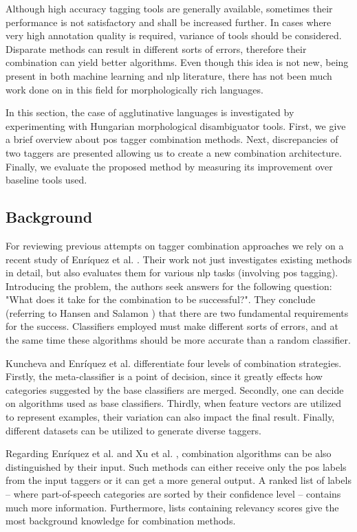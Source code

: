 Although high accuracy tagging tools are generally available, sometimes their performance is not satisfactory and shall be increased further.
In cases where very high annotation quality is required, variance of tools should be considered.
Disparate methods can result in different sorts of errors, therefore their combination can yield better algorithms.
Even though this idea is not new, being present in both machine learning and \acrshort{nlp} literature, there has not been much work done on in this field for morphologically rich languages. 

In this section, the case of agglutinative languages is investigated by experimenting with Hungarian morphological disambiguator tools.
First, we give a brief overview about \acrshort{pos} tagger combination methods.
Next, discrepancies of two taggers are presented allowing us to create a new combination architecture.
Finally, we evaluate the proposed method by measuring its improvement over baseline tools used.

\subsection{Background}

For reviewing previous attempts on tagger combination approaches we rely on a recent study of Enríquez et al. \cite{Enriquez2013study}.
Their work not just investigates existing methods in detail, but also evaluates them for various  \acrshort{nlp} tasks (involving \acrshort{pos} tagging). 
Introducing the problem, the authors seek answers for the following question:
"What does it take for the combination to be successful?".
They conclude (referring to Hansen and Salamon \cite{Hansen1990}) that there are two fundamental requirements for the success. 
Classifiers employed must make different sorts of errors, and at the same time these algorithms should be more accurate than a random classifier.

Kuncheva \cite{Kuncheva2004} and Enríquez et al. \cite{Enriquez2013study} differentiate four levels of combination strategies. 
Firstly, the meta-classifier is a point of decision, since it greatly effects how categories suggested by the base classifiers are merged. 
Secondly, one can decide on algorithms used as base classifiers.
Thirdly, when feature vectors are utilized to represent examples, their variation can also impact the final result.
Finally, different datasets can be utilized to generate diverse taggers.

Regarding Enríquez et al. \cite{Enriquez2013study} and Xu et al. \cite{Xu1992}, combination algorithms can be also distinguished by their input.
Such methods can either receive only the \acrshort{pos} labels from the input taggers or it can get a more general output. 
A ranked list of labels -- where part-of-speech categories are sorted by their confidence level -- contains much more information. 
Furthermore, lists containing relevancy scores give the most background knowledge for combination methods.


